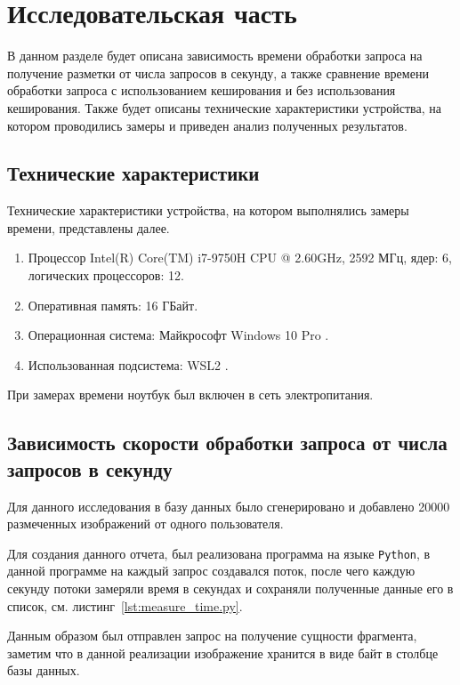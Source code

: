 \chapter{Исследовательская часть}

В данном разделе будет описана зависимость времени обработки запроса на получение разметки от числа запросов в секунду, а также сравнение времени обработки запроса с использованием кеширования и без использования кеширования. Также будет описаны технические характеристики устройства, на котором проводились замеры и приведен анализ полученных результатов.

\section{Технические характеристики}

Технические характеристики устройства, на котором выполнялись замеры времени, представлены далее.

\begin{enumerate}
	\item Процессор	Intel(R) Core(TM) i7-9750H CPU @ 2.60GHz, 2592 МГц, ядер: 6, логических процессоров: 12.
	\item Оперативная память: 16 ГБайт.
	\item Операционная система: Майкрософт Windows 10 Pro \cite{windows}.
	\item Использованная подсистема: WSL2 \cite{WSL2}.
\end{enumerate}

При замерах времени ноутбук был включен в сеть электропитания.




\section{Зависимость скорости обработки запроса от числа запросов в секунду}
Для данного исследования в базу данных было сгенерировано и добавлено 20000 размеченных изображений от одного пользователя.

Для создания данного отчета, был реализована программа на языке \texttt{Python}, в данной программе на каждый запрос создавался поток, после чего каждую секунду потоки замеряли время в секундах и сохраняли полученные данные его в список, см. листинг~\ref{lst:measure_time.py}.

Данным образом был отправлен запрос на получение сущности фрагмента, заметим что в данной реализации изображение хранится в виде байт в столбце базы данных.


